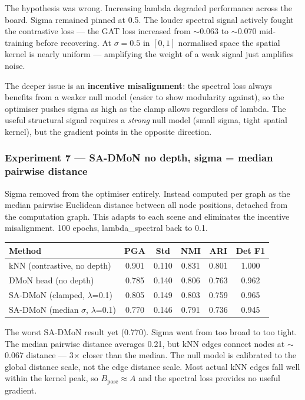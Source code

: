 The hypothesis was wrong. Increasing lambda degraded performance across the board. Sigma remained pinned at 0.5. The louder spectral signal actively fought the contrastive loss --- the GAT loss increased from $\sim$0.063 to $\sim$0.070 mid-training before recovering. At $\sigma=0.5$ in $[0,1]$ normalised space the spatial kernel is nearly uniform --- amplifying the weight of a weak signal just amplifies noise.

The deeper issue is an \textbf{incentive misalignment}: the spectral loss always benefits from a weaker null model (easier to show modularity against), so the optimiser pushes sigma as high as the clamp allows regardless of lambda. The useful structural signal requires a \emph{strong} null model (small sigma, tight spatial kernel), but the gradient points in the opposite direction.


\subsubsection{Experiment 7 --- SA-DMoN no depth, sigma = median pairwise distance}

Sigma removed from the optimiser entirely. Instead computed per graph as the median pairwise Euclidean distance between all node positions, detached from the computation graph. This adapts to each scene and eliminates the incentive misalignment. 100 epochs, lambda\_spectral back to 0.1.

\begin{center}
\begin{tabular}{lccccc}
\toprule
Method & PGA & Std & NMI & ARI & Det F1 \\
\midrule
kNN (contrastive, no depth) & 0.901 & 0.110 & 0.831 & 0.801 & 1.000 \\
DMoN head (no depth) & 0.785 & 0.140 & 0.806 & 0.763 & 0.962 \\
SA-DMoN (clamped, $\lambda$=0.1) & 0.805 & 0.149 & 0.803 & 0.759 & 0.965 \\
SA-DMoN (median $\sigma$, $\lambda$=0.1) & 0.770 & 0.146 & 0.791 & 0.736 & 0.945 \\
\bottomrule
\end{tabular}
\end{center}

The worst SA-DMoN result yet (0.770). Sigma went from too broad to too tight. The median pairwise distance averages 0.21, but kNN edges connect nodes at $\sim$0.067 distance --- 3$\times$ closer than the median. The null model is calibrated to the global distance scale, not the edge distance scale. Most actual kNN edges fall well within the kernel peak, so $B_{\text{pose}} \approx A$ and the spectral loss provides no useful gradient.


